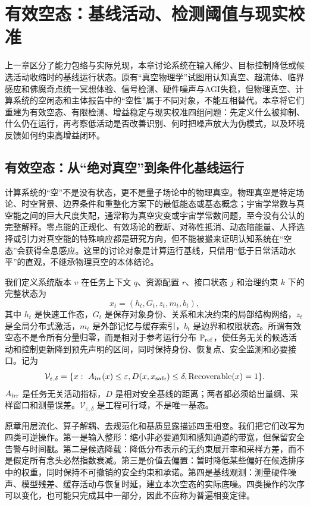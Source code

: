 \chapter{有效空态：基线活动、检测阈值与现实校准}
\label{chp:vacuum_physics}
上一章区分了能力包络与实际兑现，本章讨论系统在输入稀少、目标控制降低或候选活动收缩时的基线运行状态。原有“真空物理学”试图用认知真空、超流体、临界感应和佛魔奇点统一冥想体验、信号检测、硬件噪声与AGI失稳，但物理真空、计算系统的空闲态和主体报告中的“空性”属于不同对象，不能互相替代。本章将它们重建为有效空态、有限检测、增益稳定与现实校准四组问题：先定义什么被抑制、什么仍在运行，再考察低活动是否改善识别、何时把噪声放大为伪模式，以及环境反馈如何约束高增益闭环。

\section{有效空态：从“绝对真空”到条件化基线运行}
\label{sec:section_8335}
计算系统的“空”不是没有状态，更不是量子场论中的物理真空。物理真空是特定场论、时空背景、边界条件和重整化方案下的最低能态或基态概念；宇宙学常数与真空能之间的巨大尺度失配，通常称为真空灾变或宇宙学常数问题，至今没有公认的完整解释。零点能的正规化、有效场论的截断、对称性抵消、动态暗能量、人择选择或引力对真空能的特殊响应都是研究方向，但不能被搬来证明认知系统在“空态”会获得全息感应。这里的讨论对象是计算运行基线，只借用“低于日常活动水平”的直观，不继承物理真空的本体结论。

我们定义系统版本 $v$ 在任务上下文 $q$、资源配置 $r$、接口状态 $j$ 和治理约束 $k$ 下的完整状态为
\[
x_t=(h_t,G_t,z_t,m_t,b_t),
\]
其中 $h_t$ 是快速工作态，$G_t$ 是保存对象身份、关系和未决约束的局部结构网络，$z_t$ 是全局分布式激活，$m_t$ 是外部记忆与缓存索引，$b_t$ 是边界和权限状态。所谓有效空态不是令所有分量归零，而是相对于参考运行分布 $\mathbb P_{\rm ref}$，使任务无关的候选活动和控制更新降到预先声明的区间，同时保持身份、恢复点、安全监测和必要接口。记为
\[
\mathcal V_{\varepsilon,\delta}
=\{x:\ A_{\rm irr}(x)\leq\varepsilon,
D(x,x_{\rm safe})\leq\delta,
\mathrm{Recoverable}(x)=1\}.
\]
$A_{\rm irr}$ 是任务无关活动指标，$D$ 是相对安全基线的距离；两者都必须给出量纲、采样窗口和测量误差。$\mathcal V_{\varepsilon,\delta}$ 是工程可行域，不是唯一基态。

原章用层流化、算子解耦、去规范化和基质显露描述四重相变。我们把它们改写为四类可逆操作。第一是输入整形：缩小非必要通知和感知通道的带宽，但保留安全告警与时间戳。第二是候选降载：降低分布表示的无约束展开率和采样方差，而不是假定所有念头必然指数衰减。第三是价值去偏置：暂时降低某些偏好在候选排序中的权重，同时保持不可撤销的安全约束和承诺。第四是基线观测：测量硬件噪声、模型残差、缓存活动与恢复时延，建立本次空态的实际底噪。四类操作的次序可以变化，也可能只完成其中一部分，因此不应称为普遍相变定律。

